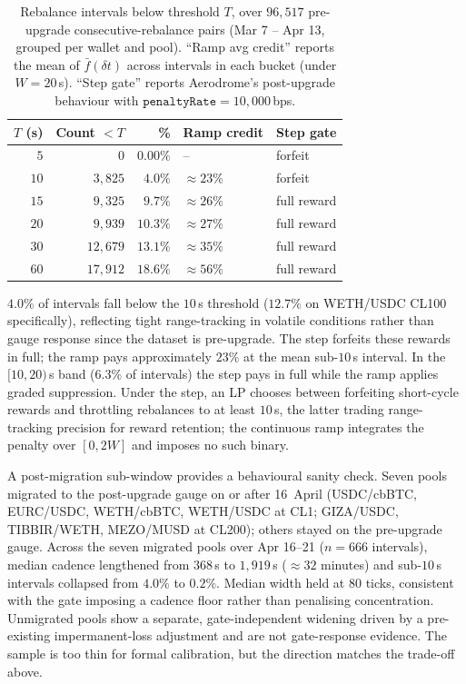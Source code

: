 \documentclass[11pt,a4paper]{article}
\theoremstyle{cgdefinition}
\theoremstyle{cgplain}
\theoremstyle{cgremark}
\begin{document}
\begin{table}[H]
\centering
\begin{tabular}{@{}rrrll@{}}
\toprule
$T$ (s) & Count $< T$ & \% & Ramp credit & Step gate \\
\midrule
$5$   & $0$        & $0.00\%$ & --                & forfeit \\
$10$  & $3{,}825$  & $4.0\%$  & $\approx 23\%$    & forfeit \\
$15$  & $9{,}325$  & $9.7\%$  & $\approx 26\%$    & full reward \\
$20$  & $9{,}939$  & $10.3\%$ & $\approx 27\%$    & full reward \\
$30$  & $12{,}679$ & $13.1\%$ & $\approx 35\%$    & full reward \\
$60$  & $17{,}912$ & $18.6\%$ & $\approx 56\%$    & full reward \\
\bottomrule
\end{tabular}
\caption{Rebalance intervals below threshold $T$, over $96{,}517$ pre-upgrade consecutive-rebalance pairs (Mar 7 -- Apr 13, grouped per wallet and pool). ``Ramp avg credit'' reports the mean of $\bar f(\delta t)$ across intervals in each bucket (under $W = 20$\,s). ``Step gate'' reports Aerodrome's post-upgrade behaviour with $\texttt{penaltyRate} = 10{,}000$\,bps.}
\label{tab:threshold}
\end{table}

$4.0\%$ of intervals fall below the $10$\,s threshold ($12.7\%$ on WETH/USDC CL100 specifically), reflecting tight range-tracking in volatile conditions rather than gauge response since the dataset is pre-upgrade. The step forfeits these rewards in full; the ramp pays approximately $23\%$ at the mean sub-$10$\,s interval. In the $[10, 20)$\,s band ($6.3\%$ of intervals) the step pays in full while the ramp applies graded suppression. Under the step, an LP chooses between forfeiting short-cycle rewards and throttling rebalances to at least $10$\,s, the latter trading range-tracking precision for reward retention; the continuous ramp integrates the penalty over $[0, 2W]$ and imposes no such binary.

A post-migration sub-window provides a behavioural sanity check. Seven pools migrated to the post-upgrade gauge on or after 16~April (USDC/cbBTC, EURC/USDC, WETH/cbBTC, WETH/USDC at CL1; GIZA/USDC, TIBBIR/WETH, MEZO/MUSD at CL200); others stayed on the pre-upgrade gauge. Across the seven migrated pools over Apr 16--21 ($n = 666$ intervals), median cadence lengthened from $368$\,s to $1{,}919$\,s ($\approx 32$ minutes) and sub-$10$\,s intervals collapsed from $4.0\%$ to $0.2\%$. Median width held at $80$ ticks, consistent with the gate imposing a cadence floor rather than penalising concentration. Unmigrated pools show a separate, gate-independent widening driven by a pre-existing impermanent-loss adjustment and are not gate-response evidence. The sample is too thin for formal calibration, but the direction matches the trade-off above.
\end{document}
